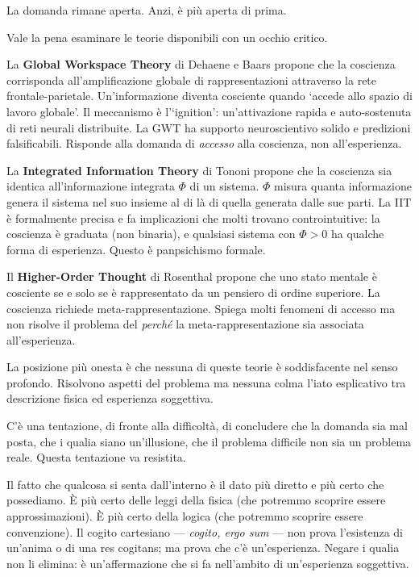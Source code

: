 \documentclass[12pt,a4paper,openany]{book}
\newcommand{\sezione}[1]{\vspace{1.2em}{\large\bfseries #1}\vspace{0.5em}\par}
\begin{document}
La domanda rimane aperta. Anzi, è più aperta di prima.

\sezione{Le teorie della coscienza a confronto}

Vale la pena esaminare le teorie disponibili con un occhio critico.

La \textbf{Global Workspace Theory} di Dehaene e Baars propone che la coscienza corrisponda all'amplificazione globale di rappresentazioni attraverso la rete frontale-parietale. Un'informazione diventa cosciente quando `accede allo spazio di lavoro globale'. Il meccanismo è l'`ignition': un'attivazione rapida e auto-sostenuta di reti neurali distribuite. La GWT ha supporto neuroscientivo solido e predizioni falsificabili. Risponde alla domanda di \textit{accesso} alla coscienza, non all'esperienza.

La \textbf{Integrated Information Theory} di Tononi propone che la coscienza sia identica all'informazione integrata $\Phi$ di un sistema. $\Phi$ misura quanta informazione genera il sistema nel suo insieme al di là di quella generata dalle sue parti. La IIT è formalmente precisa e fa implicazioni che molti trovano controintuitive: la coscienza è graduata (non binaria), e qualsiasi sistema con $\Phi > 0$ ha qualche forma di esperienza. Questo è panpsichismo formale.

Il \textbf{Higher-Order Thought} di Rosenthal propone che uno stato mentale è cosciente se e solo se è rappresentato da un pensiero di ordine superiore. La coscienza richiede meta-rappresentazione. Spiega molti fenomeni di accesso ma non risolve il problema del \textit{perché} la meta-rappresentazione sia associata all'esperienza.

La posizione più onesta è che nessuna di queste teorie è soddisfacente nel senso profondo. Risolvono aspetti del problema ma nessuna colma l'iato esplicativo tra descrizione fisica ed esperienza soggettiva.

\sezione{Perché non smettere di fare questa domanda}

C'è una tentazione, di fronte alla difficoltà, di concludere che la domanda sia mal posta, che i qualia siano un'illusione, che il problema difficile non sia un problema reale. Questa tentazione va resistita.

Il fatto che qualcosa si senta dall'interno è il dato più diretto e più certo che possediamo. È più certo delle leggi della fisica (che potremmo scoprire essere approssimazioni). È più certo della logica (che potremmo scoprire essere convenzione). Il cogito cartesiano --- \textit{cogito, ergo sum} --- non prova l'esistenza di un'anima o di una res cogitans; ma prova che c'è un'esperienza. Negare i qualia non li elimina: è un'affermazione che si fa nell'ambito di un'esperienza soggettiva.
\end{document}
